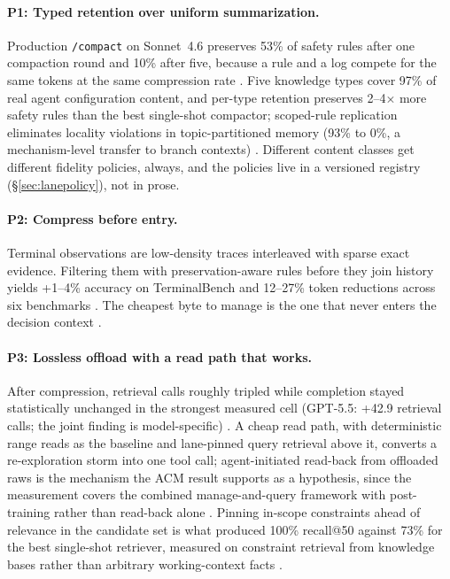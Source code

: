 \documentclass[11pt]{article}
\begin{document}
\paragraph{P1: Typed retention over uniform summarization.} Production \texttt{/compact} on Sonnet~4.6 preserves 53\% of safety rules after one compaction round and 10\% after five, because a rule and a log compete for the same tokens at the same compression rate \cite{cliff2026}. Five knowledge types cover 97\% of real agent configuration content, and per-type retention preserves 2--4$\times$ more safety rules than the best single-shot compactor; scoped-rule replication eliminates locality violations in topic-partitioned memory (93\% to 0\%, a mechanism-level transfer to branch contexts) \cite{cliff2026}. Different content classes get different fidelity policies, always, and the policies live in a versioned registry (\S\ref{sec:lanepolicy}), not in prose.

\paragraph{P2: Compress before entry.} Terminal observations are low-density traces interleaved with sparse exact evidence. Filtering them with preservation-aware rules before they join history yields +1--4\% accuracy on TerminalBench and 12--27\% token reductions across six benchmarks \cite{taco2026}. The cheapest byte to manage is the one that never enters the decision context \cite{hymem2026}.

\paragraph{P3: Lossless offload with a read path that works.} After compression, retrieval calls roughly tripled while completion stayed statistically unchanged in the strongest measured cell (GPT-5.5: +42.9 retrieval calls; the joint finding is model-specific) \cite{interact2026}. A cheap read path, with deterministic range reads as the baseline and lane-pinned query retrieval above it, converts a re-exploration storm into one tool call; agent-initiated read-back from offloaded raws is the mechanism the ACM result supports as a hypothesis, since the measurement covers the combined manage-and-query framework with post-training rather than read-back alone \cite{acm2026}. Pinning in-scope constraints ahead of relevance in the candidate set is what produced 100\% recall@50 against 73\% for the best single-shot retriever, measured on constraint retrieval from knowledge bases rather than arbitrary working-context facts \cite{cliff2026}.
\end{document}
